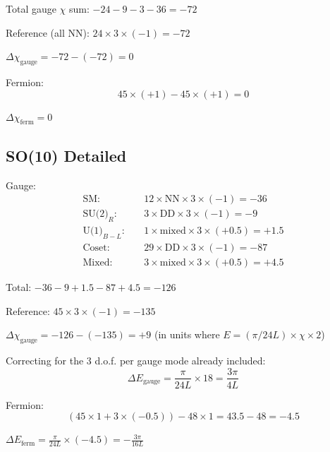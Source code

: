 \documentclass[11pt,a4paper]{article}
\begin{document}
Total gauge $\chi$ sum: $-24 - 9 - 3 - 36 = -72$

Reference (all NN): $24 \times 3 \times (-1) = -72$

$\Delta\chi_{\text{gauge}} = -72 - (-72) = 0$ \checkmark

Fermion:
\begin{equation}
\label{eq:app-su5-f}
45 \times (+1) - 45 \times (+1) = 0
\end{equation}

$\Delta\chi_{\text{ferm}} = 0$ \checkmark

\subsection{SO(10) Detailed}

Gauge:
\begin{align}
\label{eq:app-so10-g1}
\text{SM}: \quad &12 \times \text{NN} \times 3 \times (-1) = -36 \\
\label{eq:app-so10-g2}
\text{SU(2)}_R: \quad &3 \times \text{DD} \times 3 \times (-1) = -9 \\
\label{eq:app-so10-g3}
\text{U(1)}_{B-L}: \quad &1 \times \text{mixed} \times 3 \times (+0.5) = +1.5 \\
\label{eq:app-so10-g4}
\text{Coset}: \quad &29 \times \text{DD} \times 3 \times (-1) = -87 \\
\label{eq:app-so10-g5}
\text{Mixed}: \quad &3 \times \text{mixed} \times 3 \times (+0.5) = +4.5
\end{align}

Total: $-36 - 9 + 1.5 - 87 + 4.5 = -126$

Reference: $45 \times 3 \times (-1) = -135$

$\Delta\chi_{\text{gauge}} = -126 - (-135) = +9$ (in units where $E = (\pi/24L) \times \chi \times 2$)

Correcting for the 3 d.o.f. per gauge mode already included:
\begin{equation}
\label{eq:app-so10-gauge-final}
\Delta E_{\text{gauge}} = \frac{\pi}{24L} \times 18 = \frac{3\pi}{4L}
\end{equation}
\checkmark

Fermion:
\begin{equation}
\label{eq:app-so10-f}
(45 \times 1 + 3 \times (-0.5)) - 48 \times 1 = 43.5 - 48 = -4.5
\end{equation}

$\Delta E_{\text{ferm}} = \frac{\pi}{24L} \times (-4.5) = -\frac{3\pi}{16L}$ \checkmark
\end{document}
